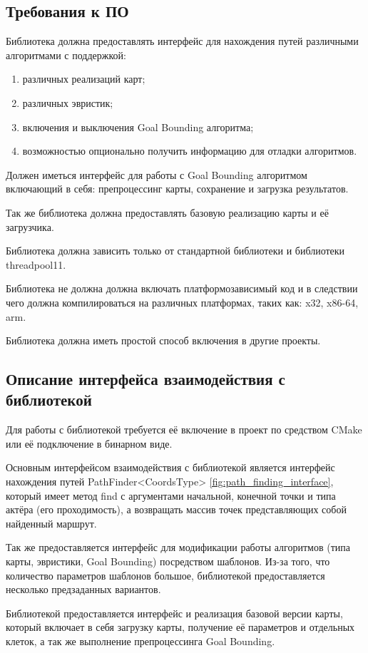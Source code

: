 \subsection{Требования к ПО}

Библиотека должна предоставлять интерфейс для нахождения путей различными алгоритмами с поддержкой:

\begin{enumerate}
	\item различных реализаций карт;
	\item различных эвристик;
	\item включения и выключения Goal Bounding алгоритма;
	\item возможностью опционально получить информацию для отладки алгоритмов.
\end{enumerate}

Должен иметься интерфейс для работы с Goal Bounding алгоритмом включающий в себя: препроцессинг карты, сохранение и загрузка результатов.

Так же библиотека должна предоставлять базовую реализацию карты и её загрузчика.

Библиотека должна зависить только от стандартной библиотеки и библиотеки threadpool11.

Библиотека не должна должна включать платформозависимый код и в следствии чего должна компилироваться на различных платформах, таких как: x32, x86-64, arm.

Библиотека должна иметь простой способ включения в другие проекты.   

\subsection{Описание интерфейса взаимодействия с библиотекой}

Для работы с библиотекой требуется её включение в проект по средством CMake или её подключение в бинарном виде. 

Основным интерфейсом взаимодействия с библиотекой является интерфейс нахождения путей PathFinder<CoordsType> \cref{fig:path_finding_interface}, который имеет метод find с аргументами начальной, конечной точки и типа актёра (его проходимость), а возвращать массив точек представляющих собой найденный маршрут.


Так же предоставляется интерфейс для модификации работы алгоритмов (типа карты, эвристики, Goal Bounding) посредством шаблонов. Из-за того, что количество параметров шаблонов большое, библиотекой предоставляется несколько предзаданных вариантов.

Библиотекой предоставляется интерфейс и реализация базовой версии карты, который включает в себя загрузку карты, получение её параметров и отдельных клеток, а так же выполнение препроцессинга Goal Bounding.   
